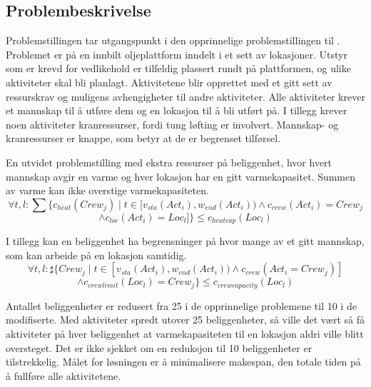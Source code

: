 \subsection{Problembeskrivelse}
Problemstillingen tar utgangspunkt i den opprinnelige problemstillingen til \bht. Problemet er på en innbilt oljeplattform inndelt i et sett av lokasjoner. Utstyr som er krevd for vedlikehold er tilfeldig plassert rundt på plattformen, og ulike aktiviteter skal bli planlagt. Aktivitetene blir opprettet med et gitt sett av ressurskrav og muligens avhengigheter til andre aktiviteter. Alle aktiviteter krever et mannskap til å utføre dem og en lokasjon til å bli utført på. I tillegg krever noen aktiviteter kranressurser, fordi tung løfting er involvert. Mannskap- og kranressurser er knappe, som betyr at de er begrenset tilførsel.

En utvidet problemstilling med ekstra ressurser på beliggenhet, hvor hvert mannskap avgir en varme og hver lokasjon har en gitt varmekapasitet. Summen av varme kan ikke overstige varmekapasiteten.
\[ \forall t,l: \sum\{c_{heat}(Crew_j) \mid t \in [ v_{sta}(Act_{i}), w_{end}(Act_{i})) \wedge c_{crew}(Act_{i}) = Crew_{j} \]
\[ \wedge c_{loc}(Act_{i}) = Loc_{l} ] \} \le c_{heatcap}(Loc_{l}) \]

I tillegg kan en beliggenhet ha begrensninger på hvor mange av et gitt mannskap, som kan arbeide på en lokasjon samtidig.
\[ \forall t,l: \sharp \{ Crew_{j} \mid  t \in [v_{sta}(Act_{i}), w_{end}(Act_{i})) \wedge c_{crew}(Act_{i} = Crew_{j})] \]
\[ \wedge c_{crewlimit}(Loc_{l}) = Crew_{j} \} \le c_{crewcapacity}(Loc_{l}) \]

Antallet beliggenheter er redusert fra 25 i de opprinnelige problemene til 10 i de modifiserte. Med aktiviteter spredt utover 25 beliggenheter, så ville det vært så få aktiviteter på hver beliggenhet at varmekapasiteten til en lokasjon aldri ville blitt oversteget. Det er ikke sjekket om en reduksjon til 10 beliggenheter er tilstrekkelig. Målet for løsningen er å minimalisere 
makespan, den totale tiden på å fullføre alle aktivitetene.